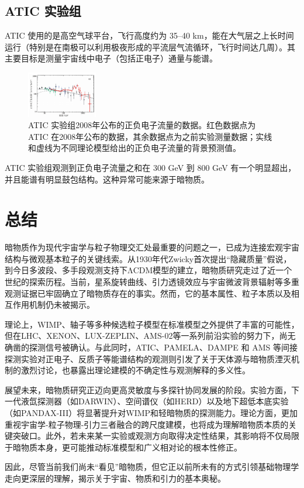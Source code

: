 \documentclass{beamer} %
\begin{document}
\subsection{ATIC 实验组}

\begin{frame}
ATIC 使用的是高空气球平台，飞行高度约为 35–40 km，能在大气层之上长时间运行（特别是在南极可以利用极夜形成的平流层气流循环，飞行时间达几周）。其主要目标是测量宇宙线中电子（包括正电子）通量与能谱。

\begin{figure}[!htbp]
    \centering    
    \includegraphics[height=2cm]{Img/4-3.png}
    \caption{ATIC 实验组2008年公布的正负电子流量的数据。红色数据点为 ATIC 在2008年公布的数据，其余数据点为之前实验测量数据；实线和虚线为不同理论模型给出的正负电子流量的背景预测值。 }
    \label{4-3}
\end{figure}

ATIC 实验组观测到正负电子流量之和在 300 GeV 到 800 GeV 有一个明显超出，并且能谱有明显鼓包结构。这种异常可能来源于暗物质。
\end{frame}

\section{总结}

\begin{frame}
暗物质作为现代宇宙学与粒子物理交汇处最重要的问题之一，已成为连接宏观宇宙结构与微观基本粒子的关键线索。从1930年代Zwicky首次提出“隐藏质量”假说，到今日多波段、多手段观测支持下ΛCDM模型的建立，暗物质研究走过了近一个世纪的探索历程。当前，星系旋转曲线、引力透镜效应与宇宙微波背景辐射等多重观测证据已牢固确立了暗物质存在的事实。然而，它的基本属性、粒子本质以及相互作用机制仍未被揭示。

理论上，WIMP、轴子等多种候选粒子模型在标准模型之外提供了丰富的可能性，但在LHC、XENON、LUX-ZEPLIN、AMS-02等一系列前沿实验的努力下，尚无确凿的探测信号被确认。与此同时，ATIC、PAMELA、DAMPE 和 AMS 等间接探测实验对正电子、反质子等能谱结构的观测则引发了关于天体源与暗物质湮灭机制的激烈讨论，也暴露出理论建模的不确定性与观测解释的多义性。
\end{frame}

\begin{frame}
展望未来，暗物质研究正迈向更高灵敏度与多探针协同发展的阶段。实验方面，下一代液氙探测器（如DARWIN）、空间谱仪（如HERD）以及地下超低本底实验（如PANDAX-III）将显著提升对WIMP和轻暗物质的探测能力。理论方面，更加重视宇宙学-粒子物理-引力三者融合的跨尺度建模，也将成为理解暗物质本质的关键突破口。此外，若未来某一实验或观测方向取得决定性结果，其影响将不仅局限于暗物质本身，更可能推动标准模型和广义相对论的根本性修正。

因此，尽管当前我们尚未“看见”暗物质，但它正以前所未有的方式引领基础物理学走向更深层的理解，揭示关于宇宙、物质和引力的基本奥秘。
\end{frame}
\end{document}
